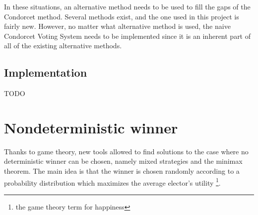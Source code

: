 \documentclass{report}
\theoremstyle{definition}
\theoremstyle{plain}
\begin{document}
In these situations, an alternative method needs to be used to fill the gaps
of the Condorcet method. Several methods exist, and the one used in this
project is fairly new. However, no matter what alternative method is used, the
naive Condorcet Voting System needs to be implemented since it is an inherent
part of all of the existing alternative methods.

\section{Implementation}
TODO

\chapter{Nondeterministic winner}
Thanks to game theory, new tools allowed to find solutions to the case where no
deterministic winner can be chosen, namely mixed strategies and the minimax
theorem. The main idea is that the winner is chosen randomly according to a
probability distribution which maximizes the average elector's utility
\footnote{the game theory term for happiness}.
\end{document}
